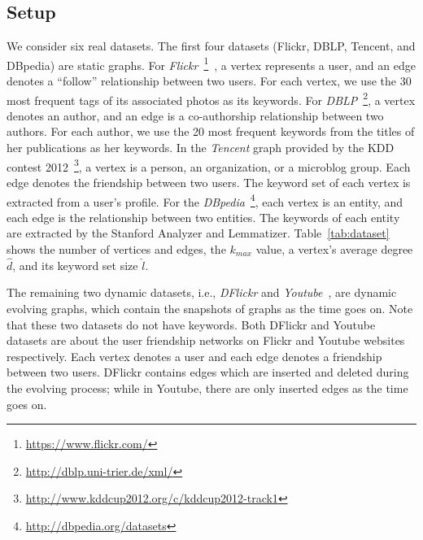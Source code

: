 \subsection{Setup}
\label{setup}

We consider six real datasets. The first four datasets (Flickr, DBLP, Tencent, and DBpedia) are static graphs.
For {\it Flickr}~\footnote{\url{https://www.flickr.com/}}~\cite{thomee2015new}, a vertex represents a user, and an edge denotes a ``follow'' relationship between two users. For each vertex, we use the 30 most frequent tags of its associated photos as its keywords.
For {\it DBLP}~\footnote{\url{http://dblp.uni-trier.de/xml/}}, a vertex denotes an author, and an edge is a co-authorship relationship between two authors.
For each author, we use the 20 most frequent keywords from the titles of her publications as her keywords.
In the {\it Tencent} graph provided by the KDD contest 2012~\footnote{\url{http://www.kddcup2012.org/c/kddcup2012-track1}}, a vertex is a person, an organization, or a microblog group. Each edge denotes the friendship between two users. The keyword set of each vertex is extracted from a user's profile. For the {\it DBpedia}~\footnote{\url{http://dbpedia.org/datasets}}, each vertex is an entity, and each edge is the relationship between two entities. The keywords of each entity are extracted by the Stanford Analyzer and Lemmatizer.
Table~\ref{tab:dataset} shows the number of vertices and edges, the $k_{max}$ value, a vertex's average degree $\widehat d$, and its keyword set size $\widehat l$.

{\color{blue}
The remaining two dynamic datasets,
i.e., {\it DFlickr} and {\it Youtube}~\cite{mislove-2009-socialnetworksthesis,mislove-2008-flickr},
are dynamic evolving graphs, which contain the snapshots of graphs as the time goes on.
Note that these two datasets do not have keywords.
Both DFlickr and Youtube datasets are about the user friendship networks on Flickr and Youtube websites respectively.
Each vertex denotes a user and each edge denotes a friendship between two users.
DFlickr contains edges which are inserted and deleted during the evolving process;
while in Youtube, there are only inserted edges as the time goes on.
}

